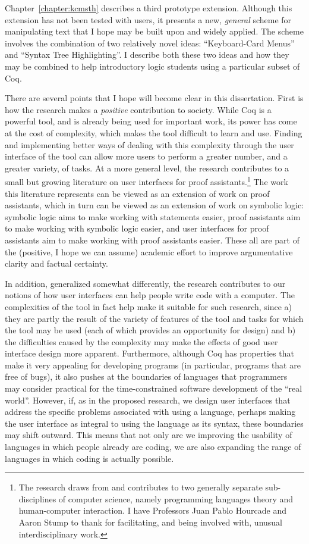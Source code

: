 \documentclass[phd,appendix]{uithesis}
\begin{document}
Chapter~\ref{chapter:kcmsth} describes a third prototype extension.  Although this extension has not been tested with users, it presents a new, \textit{general} scheme for manipulating text that I hope may be built upon and widely applied.  The scheme involves the combination of two relatively novel ideas: ``Keyboard-Card Menus'' and ``Syntax Tree Highlighting''.  I describe both these two ideas and how they may be combined to help introductory logic students using a particular subset of Coq.

There are several points that I hope will become clear in this dissertation.  First is how the research makes a \textit{positive} contribution to society.  While Coq is a powerful tool, and is already being used for important work, its power has come at the cost of complexity, which makes the tool difficult to learn and use.  Finding and implementing better ways of dealing with this complexity through the user interface of the tool can allow more users to perform a greater number, and a greater variety, of tasks.  At a more general level, the research contributes to a small but growing literature on user interfaces for proof assistants.\footnote{The research draws from and contributes to two generally separate sub-disciplines of computer science, namely programming languages theory and human-computer interaction.  I have Professors Juan Pablo Hourcade and Aaron Stump to thank for facilitating, and being involved with, unusual interdisciplinary work.}  The work this literature represents can be viewed as an extension of work on proof assistants, which in turn can be viewed as an extension of work on symbolic logic:  symbolic logic aims to make working with statements easier, proof assistants aim to make working with symbolic logic easier, and user interfaces for proof assistants aim to make working with proof assistants easier.  These all are part of the (positive, I hope we can assume) academic effort to improve argumentative clarity and factual certainty.  
	
In addition, generalized somewhat differently, the research contributes to our notions of how user interfaces can help people write code with a computer.  The complexities of the tool in fact help make it suitable for such research, since a) they are partly the result of the variety of features of the tool and tasks for which the tool may be used (each of which provides an opportunity for design) and b) the difficulties caused by the complexity may make the effects of good user interface design more apparent.  Furthermore, although Coq has properties that make it very appealing for developing programs (in particular, programs that are free of bugs), it also pushes at the boundaries of languages that programmers may consider practical for the time-constrained software development of the ``real world''.  However, if, as in the proposed research, we design user interfaces that address the specific problems associated with using a language, perhaps making the user interface as integral to using the language as its syntax, these boundaries may shift outward.  This means that not only are we improving the usability of languages in which people already are coding, we are also expanding the range of languages in which coding is actually possible.
\end{document}
